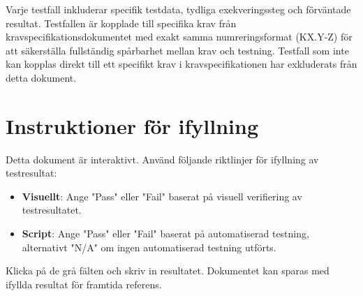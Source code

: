 \documentclass[a3paper,landscape]{article}
\begin{document}
\begin{Form}
Varje testfall inkluderar specifik testdata, tydliga exekveringssteg och förväntade resultat. Testfallen är kopplade till specifika krav från kravspecifikationsdokumentet med exakt samma numreringsformat (KX.Y-Z) för att säkerställa fullständig spårbarhet mellan krav och testning. Testfall som inte kan kopplas direkt till ett specifikt krav i kravspecifikationen har exkluderats från detta dokument.

\section*{Instruktioner för ifyllning}
Detta dokument är interaktivt. Använd följande riktlinjer för ifyllning av testresultat:
\begin{itemize}
    \item \textbf{Visuellt}: Ange "Pass" eller "Fail" baserat på visuell verifiering av testresultatet.
    \item \textbf{Script}: Ange "Pass" eller "Fail" baserat på automatiserad testning, alternativt "N/A" om ingen automatiserad testning utförts.
\end{itemize}
Klicka på de grå fälten och skriv in resultatet. Dokumentet kan sparas med ifyllda resultat för framtida referens.

\end{Form}
\end{document}
